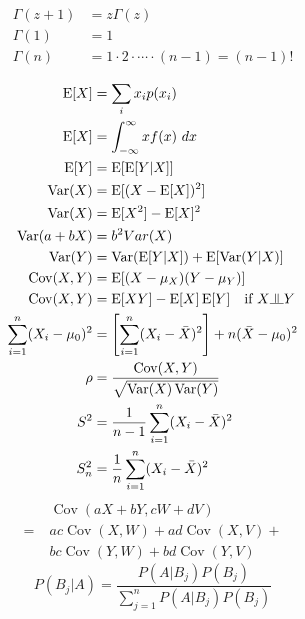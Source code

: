 \documentclass[a4paper]{article}
\newcommand{\independent}{\raisebox{0.05em}{\rotatebox[origin=c]{90}{$\models$}}}
\newcommand{\expectation}[1]{\operatorname{E}[#1]}
\DeclareMathOperator{\Var}{Var}
\DeclareMathOperator{\Cov}{Cov}
\begin{document}
\begin{multicols*}{4}
\begin{align*}
  \Gamma(z+1) &= z\Gamma(z) \\
  \Gamma(1) &= 1 \\
  \Gamma(n) &= 1 \cdot 2 \cdot \cdots \cdot (n-1) = (n-1)!
\end{align*}

\begin{align*}
  \expectation{X} &= \sum_i x_i p(x_i) \\
  \expectation{X} &= \int^\infty_{-\infty} xf(x)\ dx \\
  \expectation{Y} &= \expectation{\expectation{Y|X}} \\
  \Var(X) &= \expectation{ (X- \expectation{X})^2 } \\
  \Var(X) &= \expectation{X^2} - \expectation{X}^2 \\
  \Var(a + bX) &= b^2Var(X) \\
  \Var(Y) &= \Var(\expectation{Y|X}) + \expectation{\Var(Y|X)} \\
  \Cov(X, Y) &= \expectation{(X-\mu_X)(Y-\mu_Y)} \\
  \Cov(X, Y) &= \expectation{XY} - \expectation{X}\expectation{Y} \quad
    \text{if }X\independent Y \\
  \sum^n_{i=1}(X_i - \mu_0)^2 &=
    \left [\sum^n_{i=1}(X_i - \bar{X})^2 \right ] + n(\bar{X}-\mu_0)^2 \\
  \rho &= \frac{\Cov(X, Y)}{\sqrt{\Var(X)\Var(Y)}} \\
  S^2 &= \frac{1}{n-1} \sum^n_{i=1} (X_i - \bar{X})^2 \\
  S^2_n &= \frac{1}{n}\sum^n_{i=1} (X_i - \bar{X})^2
\end{align*}
\begin{align*}
    &\;\Cov(aX+bY, cW+dV) \\
  =&\;ac\Cov(X,W) + ad\Cov(X,V) + \\
  &\;bc\Cov(Y,W) + bd\Cov(Y,V)
\end{align*}
\begin{equation*}
P(B_j|A) = \frac{P(A|B_j) P(B_j)}{\sum^n_{j=1} P(A|B_j)P(B_j)}
\end{equation*}



\end{multicols*}
\end{document}
